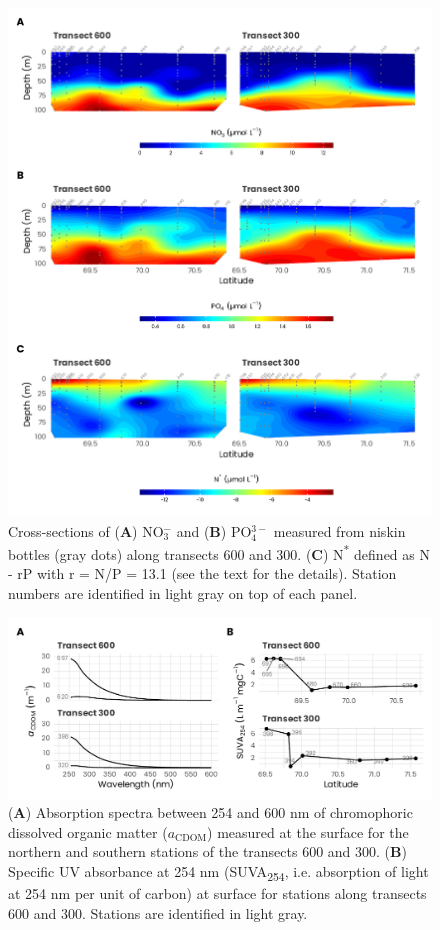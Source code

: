 \documentclass[essd, manuscript]{copernicus}
\begin{document}
\clearpage

\begin{figure}[H]
	\centering
	\includegraphics[scale = 0.85]{../../../graphs/fig06.pdf}
	\caption{Cross-sections of (\textbf{A}) NO$_3^-$ and (\textbf{B}) PO$_4^{3-}$ measured from niskin bottles (gray dots) along transects 600 and 300. (\textbf{C}) N\textsuperscript{*} defined as N - rP with r = N/P = 13.1 (see the text for the details). Station numbers are identified in light gray on top of each panel.}
\end{figure}

\clearpage

\begin{figure}[H]
	\centering
	\includegraphics[scale = 1]{../../../graphs/fig07.pdf}
	\caption{(\textbf{A}) Absorption spectra between 254 and 600 nm of chromophoric dissolved organic matter ($a_{\text{CDOM}}$) measured at the surface for the northern and southern stations of the transects 600 and 300. (\textbf{B}) Specific UV absorbance at 254 nm (SUVA\textsubscript{254}, i.e. absorption of light at 254 nm per unit of carbon) at surface for stations along transects 600 and 300. Stations are identified in light gray.}
\end{figure}
\end{document}
